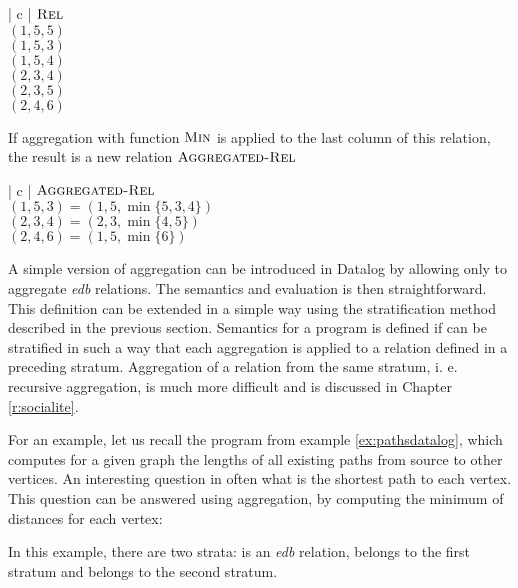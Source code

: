 \begin{centab}{ | c | }
  \hline
  $\textsc{Rel}$ \\
  \hline
  $(1, 5, 5)$ \\
  $(1, 5, 3)$ \\
  $(1, 5, 4)$ \\
  $(2, 3, 4)$ \\
  $(2, 3, 5)$ \\
  $(2, 4, 6)$ \\
  \hline
\end{centab}

If aggregation with function $\textsc{Min}$ is applied to the last column of this relation, the result is a new relation $\textsc{Aggregated-Rel}$

\begin{centab}{ | c | }
  \hline
  $\textsc{Aggregated-Rel}$ \\
  \hline
  $(1, 5, 3) = (1, 5, \min{\{5, 3, 4\}})$ \\
  $(2, 3, 4) = (2, 3, \min{\{4, 5\}})$ \\
  $(2, 4, 6) = (1, 5, \min{\{6\}})$ \\
  \hline
\end{centab}

A simple version of aggregation can be introduced in Datalog by allowing only to aggregate \emph{edb} relations. The semantics and evaluation is then straightforward. This definition can be extended in a simple way using the stratification method described in the previous section. Semantics for a program is defined if can be stratified in such a way that each aggregation is applied to a relation defined in a preceding stratum. Aggregation of a relation from the same stratum, i. e. recursive aggregation, is much more difficult and is discussed in Chapter \ref{r:socialite}.

For an example, let us recall the program from example \ref{ex:pathsdatalog}, which computes for a given graph the lengths of all existing paths from source to other vertices. An interesting question in often what is the shortest path to each vertex. This question can be answered using aggregation, by computing the minimum of distances for each vertex: 


In this example, there are two strata:  is an \emph{edb} relation,  belongs to the first stratum and  belongs to the second stratum.


